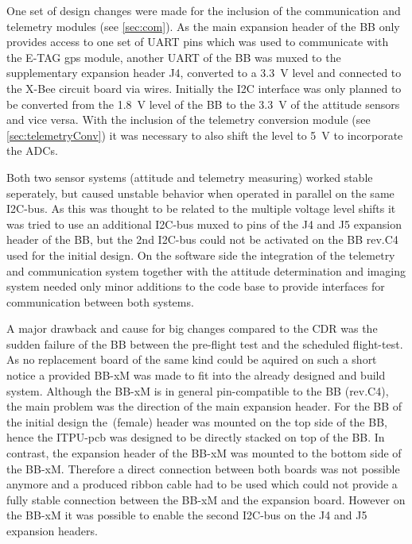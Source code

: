 One set of design changes were made for the inclusion of the communication and telemetry modules (see \ref{sec:com}). As the main expansion header of the BB only provides access to one set of UART pins which was used to communicate with the E-TAG gps module, another UART of the BB was muxed to the supplementary expansion header J4, converted to a 3.3~V level and connected to the X-Bee circuit board via wires. Initially the I2C interface was only planned to be converted from the 1.8~V level of the BB to the 3.3~V of the attitude sensors and vice versa. With the inclusion of the telemetry conversion module (see \ref{sec:telemetryConv}) it was necessary to also shift the level to 5~V to incorporate the ADCs. 

Both two sensor systems (attitude and telemetry measuring) worked stable seperately, but caused unstable behavior when operated in parallel on the same I2C-bus. As this was thought to be related to the multiple voltage level shifts it was tried to use an additional I2C-bus muxed to pins of the J4 and J5 expansion header of the BB, but the 2nd I2C-bus could not be activated on the BB rev.C4 used for the initial design.
On the software side the integration of the telemetry and communication system together with the attitude determination and imaging system needed only minor additions to the code base to provide interfaces for communication between both systems. 

A major drawback and cause for big changes compared to the CDR was the sudden failure of the BB between the pre-flight test and the scheduled flight-test. As no replacement board of the same kind could be aquired on such a short notice a provided BB-xM was made to fit into the already designed and build system. Although the BB-xM is in general pin-compatible to the BB (rev.C4), the main problem was the direction of the main expansion header. For the BB of the initial design the~(female) header was mounted on the top side of the BB, hence the ITPU-pcb was designed to be directly stacked on top of the BB. In contrast, the expansion header of the BB-xM was mounted to the bottom side of the BB-xM. Therefore a direct connection between both boards was not possible anymore and a produced ribbon cable had to be used which could not provide a fully stable connection between the BB-xM and the expansion board. However on the BB-xM it was possible to enable the second I2C-bus on the J4 and J5 expansion headers.
